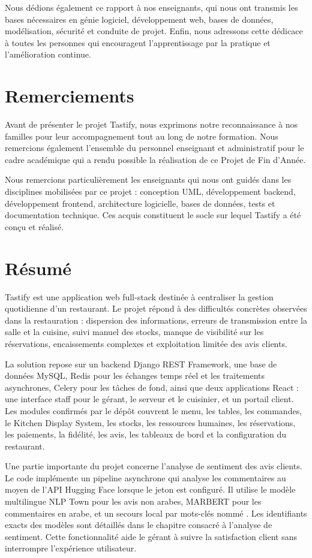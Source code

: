 Nous dédions également ce rapport à nos enseignants, qui nous ont transmis les bases nécessaires en génie logiciel, développement web, bases de données, modélisation, sécurité et conduite de projet. Enfin, nous adressons cette dédicace à toutes les personnes qui encouragent l'apprentissage par la pratique et l'amélioration continue.

\chapter*{Remerciements}
Avant de présenter le projet Tastify, nous exprimons notre reconnaissance à nos familles pour leur accompagnement tout au long de notre formation. Nous remercions également l'ensemble du personnel enseignant et administratif pour le cadre académique qui a rendu possible la réalisation de ce Projet de Fin d'Année.

Nous remercions particulièrement les enseignants qui nous ont guidés dans les disciplines mobilisées par ce projet : conception UML, développement backend, développement frontend, architecture logicielle, bases de données, tests et documentation technique. Ces acquis constituent le socle sur lequel Tastify a été conçu et réalisé.

\chapter*{Résumé}
Tastify est une application web full-stack destinée à centraliser la gestion quotidienne d'un restaurant. Le projet répond à des difficultés concrètes observées dans la restauration : dispersion des informations, erreurs de transmission entre la salle et la cuisine, suivi manuel des stocks, manque de visibilité sur les réservations, encaissements complexes et exploitation limitée des avis clients.

La solution repose sur un backend Django REST Framework, une base de données MySQL, Redis pour les échanges temps réel et les traitements asynchrones, Celery pour les tâches de fond, ainsi que deux applications React : une interface staff pour le gérant, le serveur et le cuisinier, et un portail client. Les modules confirmés par le dépôt couvrent le menu, les tables, les commandes, le Kitchen Display System, les stocks, les ressources humaines, les réservations, les paiements, la fidélité, les avis, les tableaux de bord et la configuration du restaurant.

Une partie importante du projet concerne l'analyse de sentiment des avis clients. Le code implémente un pipeline asynchrone qui analyse les commentaires au moyen de l'API Hugging Face lorsque le jeton est configuré. Il utilise le modèle multilingue NLP Town pour les avis non arabes, MARBERT pour les commentaires en arabe, et un secours local par mots-clés nommé . Les identifiants exacts des modèles sont détaillés dans le chapitre consacré à l'analyse de sentiment. Cette fonctionnalité aide le gérant à suivre la satisfaction client sans interrompre l'expérience utilisateur.

